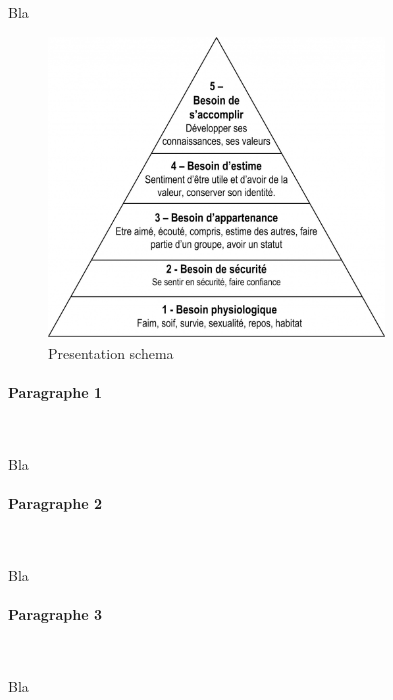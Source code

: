 Bla

\begin{figure}[!ht]
\begin{center}
\includegraphics[height=8cm]{introduction/schema_introduction}
\end{center}
\caption[schema]{Presentation schema}
\end{figure}

\paragraph*{Paragraphe 1}
~\\
\hskip7mm

Bla

\paragraph*{Paragraphe 2}
~\\
\hskip7mm

Bla

\paragraph*{Paragraphe 3}
~\\
\hskip7mm

Bla
